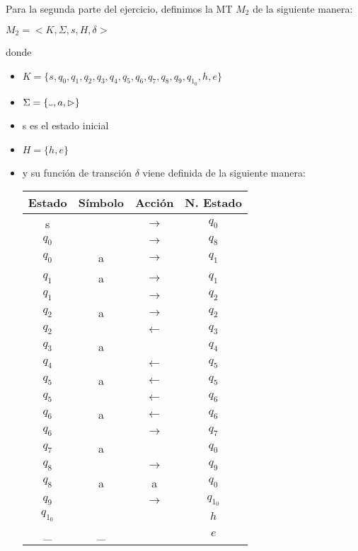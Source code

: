 \documentclass[11pt, a4paper, titlepage]{article}
\newcommand\vartextvisiblespace[1][.5em]{%
  \makebox[#1]{%
    \kern.07em
    \vrule height.3ex
    \hrulefill
    \vrule height.3ex
    \kern.07em
  }%
}
\begin{document}
Para la segunda parte del ejercicio, definimos la MT $M_2$ de la
siguiente manera:

$ M_2 = < K, \Sigma, s, H, \delta >$

donde

\begin{itemize}
\item $ K = \{ s, q_0, q_1, q_2, q_3, q_4, q_5, q_6, q_7, q_8, q_9, q_1_0, h, e \}$
\item $ \Sigma = \{\vartextvisiblespace, a, \rhd \}$
\item s es el estado inicial
\item $ H = \{ h, e \}$
\item y su función de transción $\delta$ viene definida de la siguiente manera:
  \begin{center}
    \begin{tabular}{|| c c c c ||}
      \hline
      Estado & Símbolo & Acción & N. Estado \\ [0.5ex]
      \hline\hline
      s & \vartextvisiblespace & $\rightarrow$ & $q_0$ \\
      \hline
      $q_0$ & \vartextvisiblespace & $\rightarrow$ & $q_8$ \\
      \hline
      $q_0$ & a & $\rightarrow$ & $q_1$ \\
      \hline
      $q_1$ & a & $\rightarrow$ & $q_1$ \\
      \hline
      $q_1$ & \vartextvisiblespace & $\rightarrow$ & $q_2$ \\
      \hline
      $q_2$ & a & $\rightarrow$ & $q_2$ \\
      \hline
      $q_2$ & \vartextvisiblespace & $\leftarrow$ &$q_3$ \\
      \hline
      $q_3$ & a & \vartextvisiblespace & $q_4$ \\
      \hline
      $q_4$ & \vartextvisiblespace & $\leftarrow$ & $q_5$ \\
      \hline
      $q_5$ & a & $\leftarrow$ & $q_5$ \\
      \hline
      $q_5$ & \vartextvisiblespace & $\leftarrow$ & $q_6$ \\
      \hline
      $q_6$ & a & $\leftarrow$ & $q_6$ \\
      \hline
      $q_6$ & \vartextvisiblespace & $\rightarrow$ & $q_7$ \\
      \hline
      $q_7$ & a & \vartextvisiblespace & $q_0$ \\
      \hline
      $q_8$ & \vartextvisiblespace & $\rightarrow$ & $q_9$ \\
      \hline
      $q_8$ & a & a & $q_0$ \\
      \hline
      $q_9$ & \vartextvisiblespace & $\rightarrow$ & $q_1_0$ \\
      \hline
      $q_1_0$ & \vartextvisiblespace & \vartextvisiblespace & $h$ \\
      \hline
      \_ & \_ & \vartextvisiblespace & $e$ \\
      \hline
    \end{tabular}
\end{center}
\end{itemize}
\end{document}
